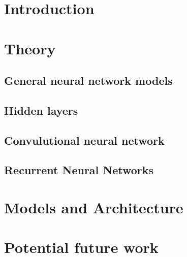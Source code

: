 \documentclass[a4paper]{article}
\begin{document}
\maketitle

\newpage
\tableofcontents
\newpage

\section{Introduction}


\section{Theory}
\subsection{General neural network models}


\subsection{Hidden layers}


\subsection{Convulutional neural network}



\subsection{Recurrent Neural Networks}





\section{Models and Architecture}


\section{Potential future work}


{}

\end{document}
